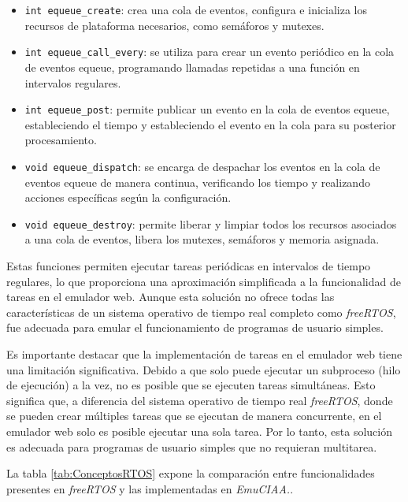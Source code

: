  \begin{itemize}
	\item \texttt{int equeue\_create}:  crea una cola de eventos, configura e inicializa los recursos de plataforma necesarios, como semáforos y mutexes.
	
	\item \texttt{int equeue\_call\_every}:  se utiliza para crear un evento periódico en la cola de eventos equeue, programando llamadas repetidas a una función en intervalos regulares.
	
	\item \texttt{int equeue\_post}: permite publicar un evento en la cola de eventos equeue, estableciendo el tiempo y estableciendo el evento en la cola para su posterior procesamiento.
	
	\item \texttt{void equeue\_dispatch}: se encarga de despachar los eventos en la cola de eventos equeue de manera continua, verificando los tiempo y realizando acciones específicas según la configuración.

	\item \texttt{void equeue\_destroy}: permite liberar y limpiar todos los recursos asociados a una cola de eventos, libera los mutexes, semáforos y memoria asignada.
\end{itemize}

Estas funciones permiten ejecutar tareas periódicas en intervalos de tiempo regulares, lo que proporciona una aproximación simplificada a la funcionalidad de tareas en el emulador web. Aunque esta solución no ofrece todas las características de un sistema operativo de tiempo real completo como \textit{freeRTOS}, fue adecuada para emular el funcionamiento de programas de usuario simples.

Es importante destacar que la implementación de tareas en el emulador web tiene una limitación significativa. Debido a que solo puede ejecutar un subproceso (hilo de ejecución) a la vez, no es posible que se ejecuten tareas simultáneas. Esto significa que, a diferencia del sistema operativo de tiempo real \textit{freeRTOS}, donde se pueden crear múltiples tareas que se ejecutan de manera concurrente, en el emulador web solo es posible ejecutar una sola tarea. Por lo tanto, esta solución es adecuada para programas de usuario simples que no requieran multitarea.

La tabla \ref{tab:ConceptosRTOS} expone la comparación entre funcionalidades presentes en \textit{freeRTOS} y las implementadas en \textit{EmuCIAA.}.

